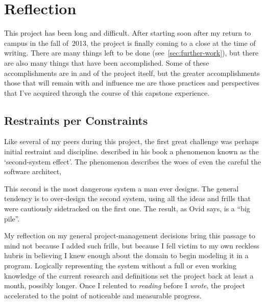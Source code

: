 \section{Reflection}
\label{sec:reflection}

This project has been long and difficult.
After starting soon after my return to campus in the fall of~2013,
  the project is finally coming to a close at the time of writing.
There are many things left to be done (see~\autoref{sec:further-work}),
  but there are also many things that have been accomplished.
Some of these accomplishments are in and of the project itself,
  but the greater accomplishments \Dash
  those that will remain with and influence me \Dash
  are those practices and perspectives that I've acquired
  through the course of this capstone experience.

\subsection{Restraints per Constraints}

Like several of my peers during this project,
  the first great challenge was perhaps initial restraint and discipline.
\citeauthor{brooks:mythical-man-month} described in his book 
  a phenomenon known as the \enquote*{second-system effect}.
The phenomenon describes the woes of even the careful the software architect,
\begin{displayquote}
  This second is the most dangerous system a man ever designs.
  \Elide
  The general tendency is to over-design the second system,
    using all the ideas and frills that were cautiously sidetracked on the first one.
  The result, as Ovid says, is a \enquote{big pile}.
\end{displayquote}
My reflection on my general project-management decisions bring this passage to mind
  not because I added such frills, but because I fell victim to my own reckless hubris
  in believing I knew enough about the domain to begin modeling it in a program.
Logically representing the system without a full \Dash or even working \Dash
  knowledge of the current research and definitions set the project back at least a month, possibly longer.
Once I relented to \emph{reading} before I \emph{wrote},
  the project accelerated to the point of noticeable and measurable progress.

